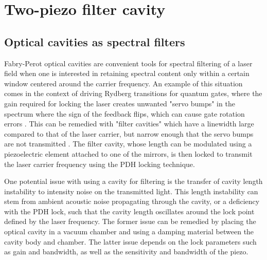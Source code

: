 \chapter{Two-piezo filter cavity}\label{ch:cavity}



\section{Optical cavities as spectral filters}

Fabry-Perot optical cavities are convenient tools for spectral filtering of a laser field when one is interested in retaining spectral content only within a certain window centered around the carrier frequency. An example of this situation comes in the context of driving Rydberg transitions for quantum gates, where the gain required for locking the laser creates unwanted "servo bumps" in the spectrum where the sign of the feedback flips, which can cause gate rotation errors \cite{jiang2023sensitivity}. This can be remedied with "filter cavities" which have a linewidth large compared to that of the laser carrier, but narrow enough that the servo bumps are not transmitted \cite{kwon2019rydberg}. The filter cavity, whose length can be modulated using a piezoelectric element attached to one of the mirrors, is then locked to transmit the laser carrier frequency using the PDH locking technique.

One potential issue with using a cavity for filtering is the transfer of cavity length instability to intensity noise on the transmitted light. This length instability can stem from ambient acoustic noise propagating through the cavity, or a deficiency with the PDH lock, such that the cavity length oscillates around the lock point defined by the laser frequency. The former issue can be remedied by placing the optical cavity in a vacuum chamber and using a damping material between the cavity body and chamber. The latter issue depends on the lock parameters such as gain and bandwidth, as well as the sensitivity and bandwidth of the piezo. 

